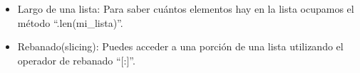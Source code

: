 \begin{itemize}
      \begin{figure}[h]
        \centering
      \end{figure}

    \item Largo de una lista: Para saber cuántos elementos hay en la lista ocupamos el método ``.len(mi\_lista)''.
    \begin{figure}[h]
        \centering
      \end{figure}
    
    \item Rebanado(slicing): Puedes acceder a una porción de una lista utilizando el operador de rebanado ``[:]''.
    \begin{figure}[h]
        \centering
      \end{figure}
    

\end{itemize}
